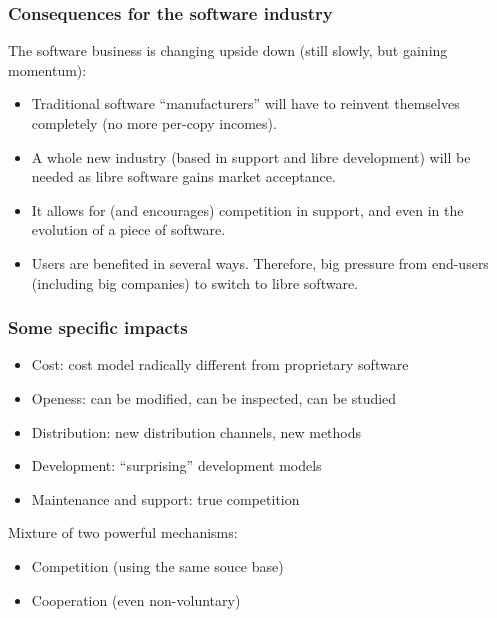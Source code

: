 \documentclass{beamer}
\begin{document}

\begin{frame}
\frametitle{Consequences for the software industry}

The software business is changing upside down (still slowly, but
gaining momentum):

\begin{itemize} 
\item Traditional software ``manufacturers'' will have to reinvent
  themselves completely (no more per-copy incomes).
\item A whole new industry (based in support and libre development)
  will be needed as libre software gains market acceptance.
\item It allows for (and encourages) competition in support, and even
  in the evolution of a piece of software.
\item Users are benefited in several ways. Therefore, big pressure
  from end-users (including big companies) to switch to libre software.
\end{itemize}

\end{frame}


\begin{frame}
\frametitle{Some specific impacts}

\begin{itemize} 
\item Cost: cost model radically different from proprietary software
\item Openess: can be modified, can be inspected, can be studied
\item Distribution: new distribution channels, new methods
\item Development: ``surprising'' development models
\item Maintenance and support: true competition
\end{itemize}

Mixture of two powerful mechanisms:

\begin{itemize}
\item Competition (using the same souce base)
\item Cooperation (even non-voluntary)
\end{itemize}

\end{frame}
\end{document}
